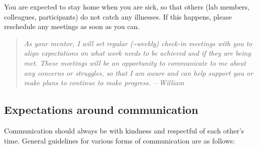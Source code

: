 \documentclass[
]{book}
\begin{document}
You are expected to stay home when you are sick, so that others (lab members, colleagues, participants) do not catch any illnesses. If this happens, please reschedule any meetings as soon as you can.

\begin{quote}
\emph{As your mentor, I will set regular (\textasciitilde weekly) check-in meetings with you to align expectations on what work needs to be achieved and if they are being met. These meetings will be an opportunity to communicate to me about any concerns or struggles, so that I am aware and can help support you or make plans to continue to make progress. -- William}
\end{quote}

\hypertarget{expectations-around-communication}{%
\subsection{Expectations around communication}\label{expectations-around-communication}}

Communication should always be with kindness and respectful of each other's time. General guidelines for various forms of communication are as follows:
\end{document}
